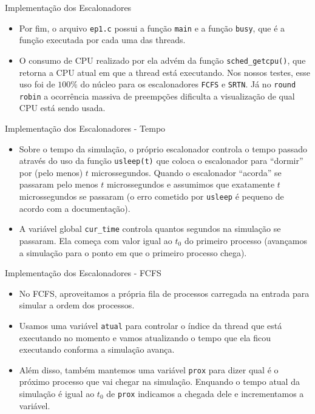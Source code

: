 \documentclass[10pt]{beamer}
\begin{document}
    \begin{frame}{Implementação dos Escalonadores}
        \begin{itemize}
                \justifying
                \item Por fim, o arquivo \texttt{ep1.c} possui a função \texttt{main} e a função
        \texttt{busy}, que é a função executada por cada uma das threads.

        \item O consumo de CPU realizado por ela advém da função \texttt{sched\_getcpu()},
        que retorna a CPU atual em que a thread está executando. Nos nossos testes,
        esse uso foi de $100\%$ do núcleo para os escalonadores \texttt{FCFS} e \texttt{SRTN}. Já no \texttt{round robin} a ocorrência massiva de preempções dificulta a visualização de qual CPU está sendo usada.
        \end{itemize}
    \end{frame}
    \begin{frame}{Implementação dos Escalonadores - Tempo}
        \begin{itemize}
            \justifying
            \item Sobre o tempo da simulação, o próprio escalonador controla o tempo passado
        através do uso da função \texttt{usleep(t)} que coloca o escalonador para ``dormir''
        por (pelo menos) $t$ microssegundos. Quando o escalonador ``acorda'' se passaram pelo
        menos $t$ microssegundos e assumimos que exatamente $t$ microssegundos se passaram (o erro cometido por \texttt{usleep} é pequeno de acordo com a documentação).

            \item A variável global \texttt{cur\_time} controla quantos segundos na simulação se passaram.
        Ela começa com valor igual ao $t_0$ do primeiro processo (avançamos a simulação para o ponto em que o primeiro processo chega).
        \end{itemize}
    \end{frame}
    \begin{frame}{Implementação dos Escalonadores - FCFS}
        \begin{itemize}
            \justifying
            \item No FCFS, aproveitamos a própria fila de processos carregada na entrada para
        simular a ordem dos processos.

        \item Usamos uma variável \texttt{atual} para controlar o índice da thread que
        está executando no momento e vamos atualizando o tempo que ela ficou
        executando conforma a simulação avança.

        \item Além disso, também mantemos uma variável \texttt{prox} para dizer qual é
        o próximo processo que vai chegar na simulação. Enquando o tempo atual da
        simulação é igual ao $t_0$ de \texttt{prox} indicamos a chegada dele e
        incrementamos a variável.
        \end{itemize}
    \end{frame}
\end{document}
